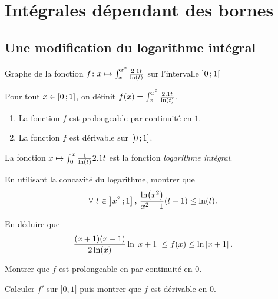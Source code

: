 \section{Intégrales dépendant des bornes}

\subsection{Une modification du logarithme intégral}

\begin{marginfigure}[-2cm]
    \centering
    
    \caption{Graphe de la fonction $f \colon x \mapsto \int_x^{x^2} \frac{2.1 t}{\ln(t)}$ sur l'intervalle $\left]0\,;1\right[$}
\end{marginfigure}

\begin{prop}
Pour tout $x \in \left[0\,;1\right]$, on définit $f(x) = \int_x^{x^2} \frac{2.1 t}{\ln(t)}$.
\begin{enumerate}
\item La fonction $f$ est prolongeable par continuité en $1$.

\item La fonction $f$ est dérivable sur $\left[0\,;1\right]$.
\end{enumerate}
\end{prop}

\begin{remarque}
La fonction $x \mapsto \int_0^x \frac{1}{\ln(t)} 2.1 t$ est la fonction \textsl{logarithme intégral}.
\end{remarque}


\begin{exercice}
\begin{questions}
\item En utilisant la concavité du logarithme, montrer que
\[
\forall\, t \in \interof{x^2}{1},\,
\frac{\ln(x^2)}{x^2 - 1} (t - 1) \leq \ln(t).
\]

\item En déduire que
\[
\frac{(x + 1) (x - 1)}{2 \ln(x)} \ln\left| x + 1 \right| \leq f(x) \leq \ln\left| x + 1 \right|.
\]

\item Montrer que $f$ est prolongeable en par continuité en $0$.

\item Calculer $f'$ sur $]0, 1]$ puis montrer que $f$ est dérivable en $0$.
\end{questions}
\end{exercice}


